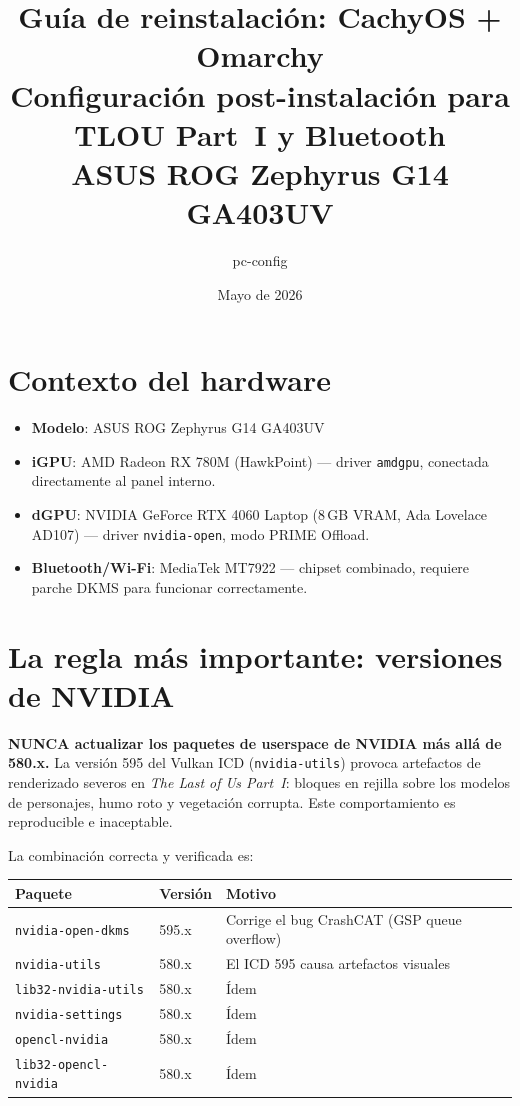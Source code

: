 \documentclass[12pt,a4paper]{article}
\title{%
  \textbf{Guía de reinstalación: CachyOS + Omarchy}\\[0.4em]
  \large Configuración post-instalación para TLOU Part~I y Bluetooth\\
  ASUS ROG Zephyrus G14 GA403UV
}
\author{pc-config}
\date{Mayo de 2026}
\begin{document}
\maketitle
\tableofcontents
\newpage

\section{Contexto del hardware}

\begin{itemize}
  \item \textbf{Modelo}: ASUS ROG Zephyrus G14 GA403UV
  \item \textbf{iGPU}: AMD Radeon RX 780M (HawkPoint) --- driver \texttt{amdgpu},
        conectada directamente al panel interno.
  \item \textbf{dGPU}: NVIDIA GeForce RTX 4060 Laptop (8\,GB VRAM, Ada Lovelace
        AD107) --- driver \texttt{nvidia-open}, modo PRIME Offload.
  \item \textbf{Bluetooth/Wi-Fi}: MediaTek MT7922 --- chipset combinado,
        requiere parche DKMS para funcionar correctamente.
\end{itemize}

\section{La regla más importante: versiones de NVIDIA}

\begin{advertencia}
\textbf{NUNCA actualizar los paquetes de userspace de NVIDIA más allá de 580.x.}
La versión 595 del Vulkan ICD (\texttt{nvidia-utils}) provoca artefactos de
renderizado severos en \emph{The Last of Us Part~I}: bloques en rejilla sobre
los modelos de personajes, humo roto y vegetación corrupta. Este comportamiento
es reproducible e inaceptable.
\end{advertencia}

La combinación correcta y verificada es:

\begin{center}
\begin{tabular}{lll}
\toprule
\textbf{Paquete} & \textbf{Versión} & \textbf{Motivo} \\
\midrule
\texttt{nvidia-open-dkms} & 595.x & Corrige el bug CrashCAT (GSP queue overflow) \\
\texttt{nvidia-utils} & 580.x & El ICD 595 causa artefactos visuales \\
\texttt{lib32-nvidia-utils} & 580.x & Ídem \\
\texttt{nvidia-settings} & 580.x & Ídem \\
\texttt{opencl-nvidia} & 580.x & Ídem \\
\texttt{lib32-opencl-nvidia} & 580.x & Ídem \\
\bottomrule
\end{tabular}
\end{center}
\end{document}
